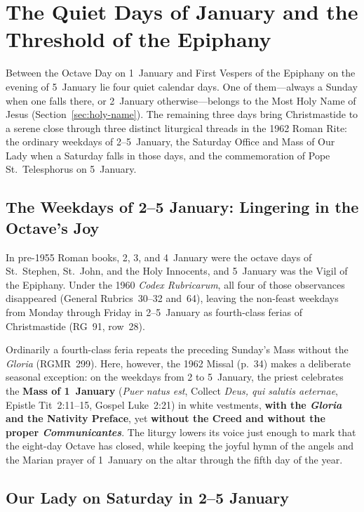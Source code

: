\section{The Quiet Days of January and the Threshold of the Epiphany}\label{sec:jan-ferias}

Between the Octave Day on 1~January and First Vespers of the Epiphany on the
evening of 5~January lie four quiet calendar days. One of them---always a
Sunday when one falls there, or 2~January otherwise---belongs to the Most Holy
Name of Jesus (Section~\ref{sec:holy-name}). The remaining three days bring
Christmastide to a serene close through three distinct liturgical threads in
the 1962 Roman Rite: the ordinary weekdays of 2--5~January, the Saturday Office
and Mass of Our Lady when a Saturday falls in those days, and the commemoration
of Pope St.~Telesphorus on 5~January.

\subsection{The Weekdays of 2--5 January: Lingering in the Octave's Joy}

In pre-1955 Roman books, 2, 3, and 4~January were the octave days of
St.~Stephen, St.~John, and the Holy Innocents, and 5~January was the Vigil of
the Epiphany. Under the 1960 \textit{Codex Rubricarum}, all four of those
observances disappeared (General Rubrics~30--32 and~64), leaving the non-feast
weekdays from Monday through Friday in 2--5~January as fourth-class ferias of
Christmastide (RG~91, row~28).

Ordinarily a fourth-class feria repeats the preceding Sunday's Mass without the
\textit{Gloria} (RGMR~299). Here, however, the 1962 Missal (p.~34) makes a
deliberate seasonal exception: on the weekdays from 2 to 5~January, the priest
celebrates the \textbf{Mass of 1~January} (\textit{Puer natus est}, Collect
\textit{Deus, qui salutis aeternae}, Epistle Tit~2:11--15, Gospel Luke~2:21) in
white vestments, \textbf{with the \textit{Gloria} and the Nativity Preface},
yet \textbf{without the Creed and without the proper \textit{Communicantes}}.
The liturgy lowers its voice just enough to mark that the eight-day Octave has
closed, while keeping the joyful hymn of the angels and the Marian prayer of
1~January on the altar through the fifth day of the year.

\subsection{Our Lady on Saturday in 2--5 January}

